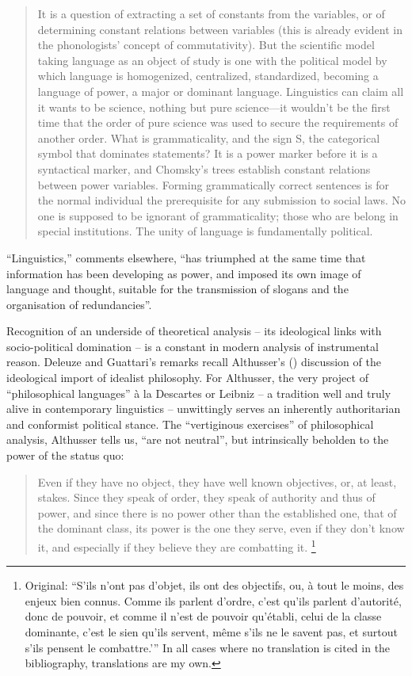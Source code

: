 \documentclass[output=paper]{langscibook}
\begin{document}
\begin{quotation}
It is a question of extracting a set of constants from the variables, or of determining constant relations between variables (this is already evident in the phonologists' concept of commutativity). But the scientific model taking language as an object of study is one with the political model by which language is homogenized, centralized, standardized, becoming a language of power, a major or dominant language. Linguistics can claim all it wants to be science, nothing but pure science—it wouldn't be the first time that the order of pure science was used to secure the requirements of another order. What is grammaticality, and the sign S, the categorical symbol that dominates statements? It is a power marker before it is a syntactical marker, and Chomsky’s trees establish constant relations between power variables. Forming grammatically correct sentences is for the normal individual the prerequisite for any submission to social laws. No one is supposed to be ignorant of grammaticality; those who are belong in special institutions. The unity of language is fundamentally political. \citep[100-101]{DeleuzeGuattari19871980}
\end{quotation}

``Linguistics,'' \citet[21]{Deleuze1977} comments elsewhere, ``has triumphed at the same time that information has been developing as power, and imposed its own image of language and thought, suitable for the transmission of slogans and the organisation of redundancies''.

Recognition of an underside of theoretical analysis – its ideological links with socio-political domination – is a constant in modern analysis of instrumental reason. Deleuze and Guattari's remarks recall Althusser's (\citeyear{Althusser2015}) discussion of the ideological import of idealist philosophy. For Althusser, the very project of ``philosophical languages'' à la Descartes or Leibniz – a tradition well and truly alive in contemporary linguistics – unwittingly serves an inherently authoritarian and conformist political stance. The ``vertiginous exercises'' of philosophical analysis, Althusser tells us, ``are not neutral'', but intrinsically beholden to the power of the status quo:

\begin{quotation}
Even if they have no object, they have well known objectives, or, at least, stakes. Since they speak of order, they speak of authority and thus of power, and since there is no power other than the established one, that of the dominant class, its power is the one they serve, even if they don’t know it, and especially if they believe they are combatting it. \citep[107]{Althusser2015}\footnote{Original: ``S'ils n'ont pas d'objet, ils ont des objectifs, ou, à tout le moins, des enjeux bien connus. Comme ils parlent d'ordre, c'est qu'ils parlent d'autorité, donc de pouvoir, et comme il n'est de pouvoir qu'établi, celui de la classe dominante, c'est le sien qu'ils servent, même s'ils ne le savent pas, et surtout s'ils pensent le combattre.'\thinspace'' In all cases where no translation is cited in the bibliography, translations are my own.}
\end{quotation}
\end{document}
